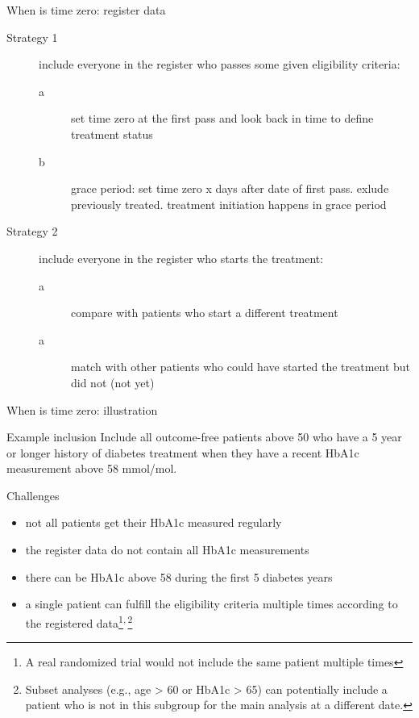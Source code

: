 \documentclass{beamer}\usepackage{listings}
\begin{document}
\begin{frame}[label={sec:orgd06534d}]{When is time zero: register data}
\begin{description}
\item[{Strategy 1}] include everyone in the register who passes some given
eligibility criteria:
\begin{description}
\item[{a}] set time zero at the first pass and look back in time to define treatment status
\item[{b}] grace period: set time zero x days after date of first pass. exlude previously treated. 
treatment initiation happens in grace period
\end{description}
\end{description}
\vfill\pause     
\begin{description}
\item[{Strategy 2}] include everyone in the register who starts 
the treatment:
\begin{description}
\item[{a}] compare with patients who start a different treatment
\item[{a}] match with other patients who could have started the treatment but did not (not yet)
\end{description}
\end{description}
\end{frame}

\begin{frame}[label={sec:org7923855}]{When is time zero: illustration}
\begin{block}{Example inclusion}
Include all outcome-free patients above 50 who have a 5 year or longer history of
diabetes treatment when they have a recent HbA1c measurement above 58
mmol/mol.  \vfill\pause
\end{block}

\begin{block}{Challenges}
\begin{itemize}
\item not all patients get their HbA1c measured regularly
\item the register data do not contain all HbA1c measurements
\item there can be HbA1c above 58 during the first 5 diabetes years
\item a single patient can fulfill the eligibility criteria multiple times
according to the registered data\footnote{A real randomized trial would not include the same patient multiple times}\textsuperscript{,}\,\footnote{Subset analyses (e.g., age > 60 or HbA1c > 65) can potentially
include a patient who is not in this subgroup for the main analysis at
a different date.}
\end{itemize}
\end{block}
\end{frame}
\end{document}
